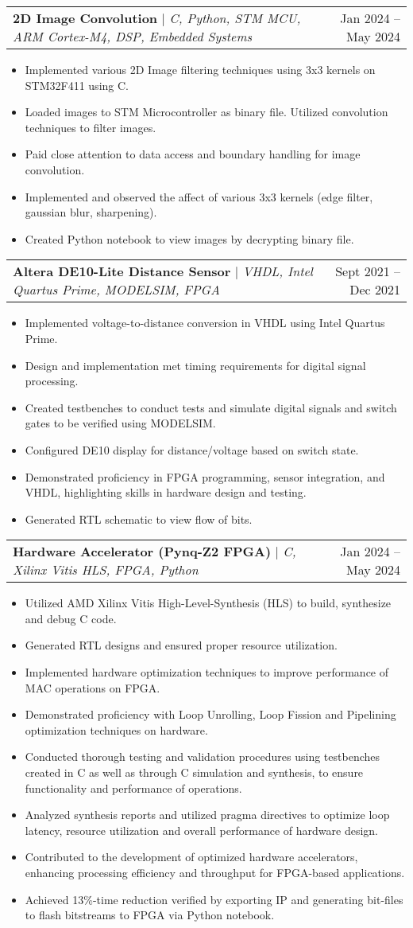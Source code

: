 \documentclass[A4,10pt]{article}
\makeatletter
\newcommand{\resumeItem}[1]{
  \item\small{
    {#1 \vspace{-2pt}}
  }
}
\newcommand{\resumeProjectHeading}[2]{
    \item
    \begin{tabular*}{0.97\textwidth}{l@{\extracolsep{\fill}}r}
      \small#1 & #2 \\
    \end{tabular*}\vspace{-7pt}
}
\newcommand{\resumeItemListStart}{\begin{itemize}}
\newcommand{\resumeItemListEnd}{\end{itemize}\vspace{-5pt}}
\makeatother
\begin{document}
        \resumeProjectHeading
        {\textbf{2D Image Convolution} $|$ \emph{C, Python, STM MCU, ARM Cortex-M4, DSP, Embedded Systems}}{Jan 2024 -- May 2024}
        \resumeItemListStart
          \resumeItem{Implemented various 2D Image filtering techniques using 3x3 kernels on STM32F411 using C.}
          \resumeItem{Loaded images to STM Microcontroller as binary file. Utilized convolution techniques to filter images.}
          \resumeItem{Paid close attention to data access and boundary handling for image convolution.}
          \resumeItem{Implemented and observed the affect of various 3x3 kernels (edge filter, gaussian blur, sharpening).}
          \resumeItem{Created Python notebook to view images by decrypting binary file.}
        \resumeItemListEnd

        \resumeProjectHeading
        {\textbf{Altera DE10-Lite Distance Sensor} $|$ \emph{VHDL, Intel Quartus Prime, MODELSIM, FPGA}}{Sept 2021 -- Dec 2021}
        \resumeItemListStart
          \resumeItem{Implemented voltage-to-distance conversion in VHDL using Intel Quartus Prime.}
          \resumeItem{Design and implementation met timing requirements for digital signal processing.}
          \resumeItem{Created testbenches to conduct tests and simulate digital signals and switch gates to be verified using MODELSIM.}
          \resumeItem{Configured DE10 display for distance/voltage based on switch state.}
          \resumeItem{Demonstrated proficiency in FPGA programming, sensor integration, and VHDL, highlighting skills in hardware design and testing.}
          \resumeItem{Generated RTL schematic to view flow of bits.}
        \resumeItemListEnd
  
        \resumeProjectHeading
        {\textbf{Hardware Accelerator (Pynq-Z2 FPGA)} $|$ \emph{C, Xilinx Vitis HLS, FPGA, Python}}{Jan 2024 -- May 2024}
        \resumeItemListStart
          \resumeItem{Utilized AMD Xilinx Vitis High-Level-Synthesis (HLS) to build, synthesize and debug C code.}
          \resumeItem{Generated RTL designs and ensured proper resource utilization.}
          \resumeItem{Implemented hardware optimization techniques to improve performance of MAC operations on FPGA.}
          \resumeItem{Demonstrated proficiency with Loop Unrolling, Loop Fission and Pipelining optimization techniques on hardware.}
          \resumeItem{Conducted thorough testing and validation procedures using testbenches created in C as well as through C simulation and synthesis, to ensure functionality and performance of operations.}
          \resumeItem{Analyzed synthesis reports and utilized pragma directives to optimize loop latency, resource utilization and overall performance of hardware design.}
          \resumeItem{Contributed to the development of optimized hardware accelerators, enhancing processing efficiency and throughput for FPGA-based applications.}
          \resumeItem{Achieved 13\%-time reduction verified by exporting IP and generating bit-files to flash bitstreams to FPGA via Python notebook.}
        \resumeItemListEnd
\end{document}
